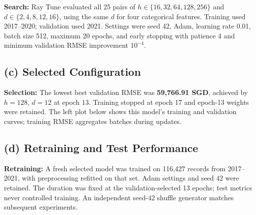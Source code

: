 \documentclass[10pt,a4paper]{article}
\begin{document}
\textbf{Search:} Ray Tune evaluated all 25 pairs of $h\in\{16,32,64,128,256\}$ and $d\in\{2,4,8,12,16\}$, using the same $d$ for four categorical features. Training used 2017--2020; validation used 2021. Settings were seed 42, Adam, learning rate 0.01, batch size 512, maximum 20 epochs, and early stopping with patience 4 and minimum validation RMSE improvement $10^{-4}$.
\subsection*{(c) Selected Configuration}

\textbf{Selection:} The lowest best validation RMSE was \textbf{59,766.91 SGD}, achieved by $h=128$, $d=12$ at epoch 13. Training stopped at epoch 17 and epoch-13 weights were retained. The left plot below shows this model's training and validation curves; training RMSE aggregates batches during updates.
\subsection*{(d) Retraining and Test Performance}

\textbf{Retraining:} A fresh selected model was trained on 116,427 records from 2017--2021, with preprocessing refitted on that set. Adam settings and seed 42 were retained. The duration was fixed at the validation-selected 13 epochs; test metrics never controlled training. An independent seed-42 shuffle generator matches subsequent experiments.
\end{document}
